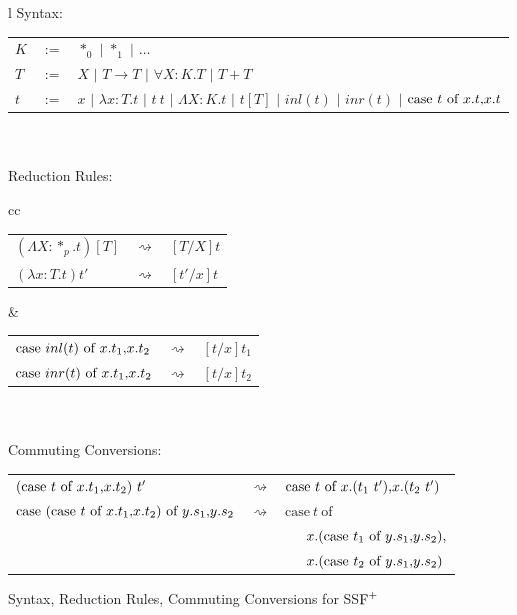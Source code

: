 \begin{figure}
  \begin{center}
    \begin{tabular}{l}
      Syntax:\\
      \begin{tabular}{lll}
        $K$ & $:=$ & $*_0$ $|$ $*_1$             $|$ $\ldots$\\
        $T$ & $:=$ & $X$   $|$ $T \rightarrow T$ $|$ $\forall X:K.T$  $|$ $T + T$\\
        $t$ & $:=$ & $x$   $|$ $\lambda x:T.t$   $|$ $t\ t$ $|$ 
        $\Lambda X:K.t$ $|$ $t[T]$ $|$ $inl(t)$ $|$ $inr(t)$ $|$ $\mbox{case}\ t\ \text{of}\ x\text{.}t\text{,}x\text{.}t$\\
      \end{tabular}
      \\ \\
      Reduction Rules:\\
      \begin{tabular}{cc}
        \begin{tabular}{lll}
          $(\Lambda X:*_p.t)[T]$ & $\rightsquigarrow$ & $[T/X]t$\\
          $(\lambda x:T.t)t'$    & $\rightsquigarrow$ & $[t'/x]t$\\
        \end{tabular}
        &
        \begin{tabular}{lll}
          $\mbox{case}\ inl(t)\ \text{of}\ x\text{.}t_1\text{,}x\text{.}t_2$ & $\rightsquigarrow$ & $[t/x]t_1$\\
          $\mbox{case}\ inr(t)\ \text{of}\ x\text{.}t_1\text{,}x\text{.}t_2$ & $\rightsquigarrow$ & $[t/x]t_2$
        \end{tabular}
      \end{tabular}
      \\ \\
      Commuting Conversions:\\
      \begin{tabular}{lll}
        $(\mbox{case}\ t\ \text{of}\ x\text{.}t_1\text{,}x\text{.}t_2)\ t'$ & $\rightsquigarrow$ & 
        $\mbox{case}\ t\ \text{of}\ x\text{.}(t_1\ t')\text{,}x\text{.}(t_2\ t')$\\
        $\mbox{case}\ (\mbox{case}\ t\ \text{of}\ x\text{.}t_1\text{,}x\text{.}t_2)\ \text{of}\ y\text{.}s_1\text{,}y\text{.}s_2$ & $\rightsquigarrow$ & 
        $\mbox{case}\ t\ \mbox{of}\ $\\
        &                    & \ \ \ $x.(\mbox{case}\ t_1\ \text{of}\ y\text{.}s_1\text{,}y\text{.}s_2),$\\
        &                    & \ \ \ $x.(\mbox{case}\ t_2\ \text{of}\ y\text{.}s_1\text{,}y\text{.}s_2)$
      \end{tabular}
    \end{tabular}
  \end{center}
  
  \caption[]{Syntax, Reduction Rules, Commuting Conversions for SS$\mbox{F}^{+}$}
  \label{fig:syntax_ssfp}
\end{figure}

